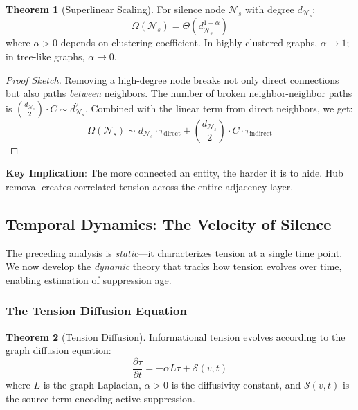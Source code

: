 \documentclass[11pt,a4paper]{article}
\theoremstyle{definition}
\newtheorem{theorem}{Theorem}[section]
\theoremstyle{remark}
\newcommand{\NS}{\mathcal{N}_s}
\newcommand{\CO}{\Omega}
\begin{document}
\begin{theorem}[Superlinear Scaling]
\label{thm:scaling}
For silence node $\NS$ with degree $d_{\NS}$:
\begin{equation}
    \CO(\NS) = \Theta\left( d_{\NS}^{1+\alpha} \right)
\end{equation}
where $\alpha > 0$ depends on clustering coefficient. In highly clustered graphs, $\alpha \to 1$; in tree-like graphs, $\alpha \to 0$.
\end{theorem}

\begin{proof}[Proof Sketch]
Removing a high-degree node breaks not only direct connections but also paths \emph{between} neighbors. The number of broken neighbor-neighbor paths is $\binom{d_{\NS}}{2} \cdot C \sim d_{\NS}^2$. Combined with the linear term from direct neighbors, we get:
\begin{equation}
    \CO(\NS) \sim d_{\NS} \cdot \tau_{\text{direct}} + \binom{d_{\NS}}{2} \cdot C \cdot \tau_{\text{indirect}}
\end{equation}
\end{proof}

\textbf{Key Implication}: The more connected an entity, the harder it is to hide. Hub removal creates correlated tension across the entire adjacency layer.

\subsection{Temporal Dynamics: The Velocity of Silence}

The preceding analysis is \emph{static}---it characterizes tension at a single time point. We now develop the \emph{dynamic} theory that tracks how tension evolves over time, enabling estimation of suppression age.

\subsubsection{The Tension Diffusion Equation}

\begin{theorem}[Tension Diffusion]
\label{thm:diffusion}
Informational tension evolves according to the graph diffusion equation:
\begin{equation}
    \boxed{
    \frac{\partial \tau}{\partial t} = -\alpha L \tau + \mathcal{S}(v, t)
    }
\end{equation}
where $L$ is the graph Laplacian, $\alpha > 0$ is the diffusivity constant, and $\mathcal{S}(v,t)$ is the source term encoding active suppression.
\end{theorem}
\end{document}
